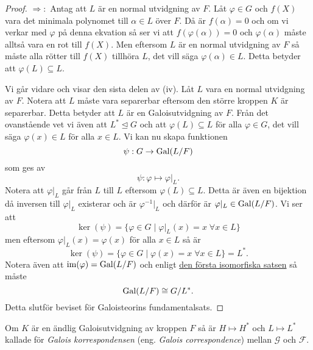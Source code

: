 \documentclass{article}
\newcommand{\im}[0]{\textnormal{im}}
\newcommand{\gal}[0]{\textnormal{Gal}}
\theoremstyle{definition}
\begin{document}
\begin{proof}
  $\Rightarrow:$ Antag att $L$ är en normal utvidgning av $F$. Låt $\varphi \in G$ och $f(X)$ vara det minimala polynomet till $\alpha \in L$ över $F$. Då är 
  $f(\alpha) = 0$ och om vi verkar med $\varphi$ på denna ekvation så ser vi att $f(\varphi(\alpha)) = 0$ och $\varphi(\alpha)$ måste alltså vara 
  en rot till $f(X)$. Men eftersom $L$ är en normal utvidgning av $F$ så måste alla rötter till $f(X)$ tillhöra $L$, det vill säga $\varphi(\alpha) \in L$. 
  Detta betyder att $\varphi(L) \subseteq L$.

  Vi går vidare och visar den sista delen av (iv). Låt $L$ vara en normal utvidgning av $F$. Notera att $L$ måste vara separerbar eftersom 
  den större kroppen $K$ är separerbar. Detta betyder att $L$ är en Galoisutvidgning av $F$. Från det ovanstående vet vi även att 
  $L^* \trianglelefteq G$ och att $\varphi(L) \subseteq L$ för alla $\varphi \in G$, det vill säga $\varphi(x) \in L$ för alla $x \in L$.
  Vi kan nu skapa funktionen
  \[\psi: G \rightarrow \gal(L/F)\]
  som ges av 
  \[\psi: \varphi \mapsto \varphi|_L.\]
  Notera att $\varphi|_L$ går från $L$ till $L$ eftersom $\varphi(L) \subseteq L$. Detta är även en bijektion då inversen till $\varphi|_L$
  existerar och är $\varphi^{-1}|_L$ och därför är $\varphi|_L \in \gal(L/F)$. 
  Vi ser att 
  \[\ker (\psi) = \{\varphi \in G \; | \; \varphi|_L(x) = x \; \forall x \in L\}\]
  men eftersom $\varphi|_L(x) = \varphi(x)$ för alla $x \in L$ så är 
  \[\ker (\psi) = \{\varphi \in G \; | \; \varphi(x) = x \; \forall x \in L\} = L^*.\]
  Notera även att $\im(\varphi) = \gal(L/F)$ och enligt \hyperlink{isomorfiska}{den första isomorfiska satsen} så måste 
  \[\gal(L/F) \cong G/L^*.\]
  Detta slutför beviset för Galoisteorins fundamentalsats. 
\end{proof}

\begin{mydef}{}{}
  Om $K$ är en ändlig Galoisutvidgning av kroppen $F$ så är $H \mapsto H^*$ och $L \mapsto L^*$ kallade för \textit{Galois korrespondensen} 
  (eng. \textit{Galois correspondence}) mellan $\mathcal{G}$ och $\mathcal{F}$. 
\end{mydef}
\end{document}
